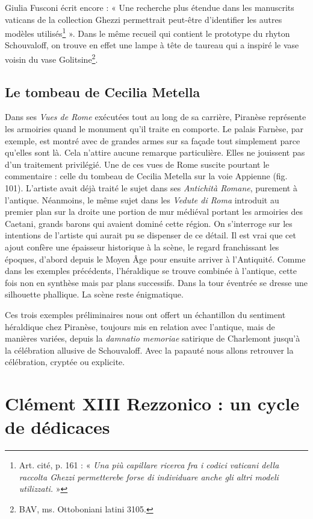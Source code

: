 \documentclass[12pt,twoside,openany]{book}
\begin{document}
Giulia Fusconi écrit encore : « Une recherche plus étendue dans les manuscrits vaticans de la collection Ghezzi permettrait peut-être d’identifier les autres modèles utilisés\footnote{Art. cité, p. 161 : « \textit{Una più capillare ricerca fra i codici vaticani della raccolta Ghezzi permetterebe forse di individuare anche gli altri modeli utilizzati.} »} ». Dans le même recueil qui contient le prototype du rhyton Schouvaloff, on trouve en effet une lampe à tête de taureau qui a inspiré le vase voisin du vase Golitsine\footnote{BAV, ms. Ottoboniani latini 3105.}.

\subsection{Le tombeau de Cecilia Metella}

Dans ses \textit{Vues de Rome} exécutées tout au long de sa carrière, Piranèse représente les armoiries quand le monument qu’il traite en comporte. Le palais Farnèse, par exemple, est montré avec de grandes armes sur sa façade tout simplement parce qu’elles sont là. Cela n’attire aucune remarque particulière. Elles ne jouissent pas d’un traitement privilégié. Une de ces vues de Rome suscite pourtant le commentaire : celle du tombeau de Cecilia Metella sur la voie Appienne (fig. 101). L’artiste avait déjà traité le sujet dans ses \textit{Antichità Romane}, purement à l’antique. Néanmoins, le même sujet dans les \textit{Vedute di Roma} introduit au premier plan sur la droite une portion de mur médiéval portant les armoiries des Caetani, grands barons qui avaient dominé cette région. On s’interroge sur les intentions de l’artiste qui aurait pu se dispenser de ce détail. Il est vrai que cet ajout confère une épaisseur historique à la scène, le regard franchissant les époques, d’abord depuis le Moyen Âge pour ensuite arriver à l’Antiquité. Comme dans les exemples précédents, l’héraldique se trouve combinée à l’antique, cette fois non en synthèse mais par plans successifs. Dans la tour éventrée se dresse une silhouette phallique. La scène reste énigmatique.

Ces trois exemples préliminaires nous ont offert un échantillon du sentiment héraldique chez Piranèse, toujours mis en relation avec l’antique, mais de manières variées, depuis la \textit{damnatio memoriae} satirique de Charlemont jusqu’à la célébration allusive de Schouvaloff. Avec la papauté nous allons retrouver la célébration, cryptée ou explicite.

\section{Clément XIII Rezzonico : un cycle de dédicaces}
\end{document}
